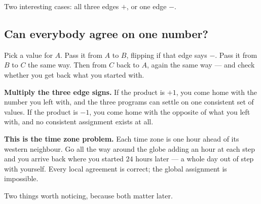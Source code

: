 \documentclass[11pt,a4paper]{article}
\begin{document}
\begin{center}
\end{center}

Two interesting cases: all three edges $+$, or one edge $-$.

\subsection*{Can everybody agree on one number?}

Pick a value for $A$. Pass it from $A$ to $B$, flipping if that edge says $-$.
Pass it from $B$ to $C$ the same way. Then from $C$ back to $A$, again the same
way --- and check whether you get back what you started with.

\textbf{Multiply the three edge signs.} If the product is $+1$, you come home
with the number you left with, and the three programs can settle on one
consistent set of values. If the product is $-1$, you come home with the
opposite of what you left with, and no consistent assignment exists at all.

\begin{keybox}
\textbf{This is the time zone problem.} Each time zone is one hour ahead of its
western neighbour. Go all the way around the globe adding an hour at each step
and you arrive back where you started $24$ hours later --- a whole day out of
step with yourself. Every local agreement is correct; the global assignment is
impossible.
\end{keybox}

Two things worth noticing, because both matter later.
\end{document}
